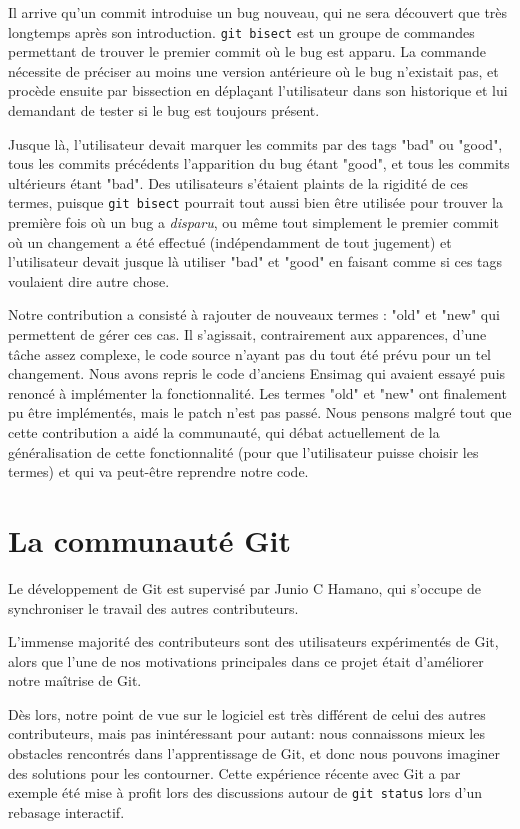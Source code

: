 \documentclass[a4paper, 12pt]{article}
\newcommand{\gitcmd}[1]{\lstinline|#1|}
\begin{document}
Il arrive qu'un commit introduise un bug nouveau, qui ne sera découvert que très longtemps après son introduction. \gitcmd{git bisect} est un groupe de commandes permettant de trouver le premier commit où le bug est apparu. La commande nécessite de préciser au moins une version antérieure où le bug n'existait pas, et procède ensuite par bissection en déplaçant l'utilisateur dans son historique et lui demandant de tester si le bug est toujours présent.


Jusque là, l'utilisateur devait marquer les commits par des tags "bad" ou "good", tous les commits précédents l'apparition du bug étant "good", et tous les commits ultérieurs étant "bad". Des utilisateurs s'étaient plaints de la rigidité de ces termes, puisque \gitcmd{git bisect} pourrait tout aussi bien être utilisée pour trouver la première fois où un bug a \emph{disparu}, ou même tout simplement le premier commit où un changement a été effectué (indépendamment de tout jugement) et l'utilisateur devait jusque là utiliser "bad" et "good" en faisant comme si ces tags voulaient dire autre chose.


Notre contribution a consisté à rajouter de nouveaux termes : "old" et "new" qui permettent de gérer ces cas. Il s'agissait, contrairement aux apparences, d'une tâche assez complexe, le code source n'ayant pas du tout été prévu pour un tel changement. Nous avons repris le code d'anciens Ensimag qui avaient essayé puis renoncé à implémenter la fonctionnalité. Les termes "old" et "new" ont finalement pu être implémentés, mais le patch n'est pas passé. Nous pensons malgré tout que cette contribution a aidé la communauté, qui débat actuellement de la généralisation de cette fonctionnalité (pour que l'utilisateur puisse choisir les termes) et qui va peut-être reprendre notre code.


\section{La communauté Git}

Le développement de Git est supervisé par Junio C Hamano, qui s'occupe de synchroniser le travail des autres contributeurs.

L'immense majorité des contributeurs sont des utilisateurs expérimentés de Git, alors que l'une de nos motivations principales dans ce projet était d'améliorer notre maîtrise de Git.

Dès lors, notre point de vue sur le logiciel est très différent de celui des autres contributeurs, mais pas inintéressant pour autant: nous connaissons mieux les obstacles rencontrés dans l'apprentissage de Git, et donc nous pouvons imaginer des solutions pour les contourner. Cette expérience récente avec Git a par exemple été mise à profit lors des discussions autour de \gitcmd{git status} lors d'un rebasage interactif.
\end{document}
